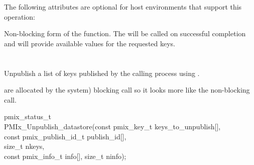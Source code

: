 \reqattrend

\optattrstart
The following attributes are optional for host environments that support this operation:


\optattrend

\descr

Non-blocking form of the  function.  The  
will be called on successful completion and will provide available values for the requested keys.

\section{}

\summary

Unpublish a list of keys published by the calling process using .

are allocated by the system)
blocking call so it looks more like the non-blocking call.

\format

\cspecificstart
\begin{codepar}
pmix_status_t \\
PMIx_Unpublish_datastore(const pmix_key_t keys_to_unpublish[], \\
\hspace*{15\sigspace}const pmix_publish_id_t publish_id[], \\
\hspace*{15\sigspace}size_t nkeys, \\
\hspace*{15\sigspace}const pmix_info_t info[], size_t ninfo);
\end{codepar}
\cspecificend

\begin{arglist}
\end{arglist}

